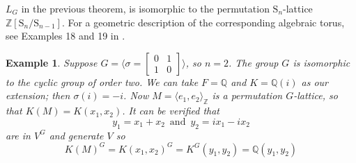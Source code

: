 \documentclass[12pt]{article}
\theoremstyle{plain}
\newtheorem{example}[theorem]{Example}
\newcommand{\Z}{\ensuremath{\mathbb{Z}}}
\newcommand{\Q}{\ensuremath{\mathbb{Q}}}
\begin{document}
$L_G$ in the previous theorem, is isomorphic to the permutation
$\mathrm{S}_n$-lattice $\Z[\mathrm{S}_n/\mathrm{S}_{n-1}]$. For a
geometric description of the corresponding algebraic torus, see
Examples 18 and 19 in \cite{Voskresenskii}.


\begin{example}	
Suppose $G = \langle \sigma = \begin{bmatrix}
0&1\\
1&0
\end{bmatrix}\rangle$, so $n = 2$. 
The group $G$ is isomorphic to the cyclic group of order two. We can
take $F = \Q$ and $K = \Q(i)$ as our extension; then $\sigma(i) =
-i$. Now $M = \langle e_1, e_2 \rangle_{\Z}$ is a permutation
$G$-lattice, so that $K(M) = K(x_1,x_2)$. It can be verified
that $$y_1 = x_1+x_2\,\,\, \textrm{and}\,\,\, y_2 = ix_1 -ix_2 $$ are
in $V^G$ and generate $V$ so $$K(M)^G = K(x_1,x_2)^G = K^G(y_1,y_2) =
\Q(y_1,y_2)$$
\end{example}
\end{document}
